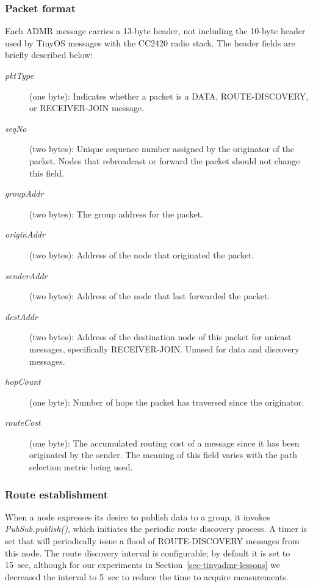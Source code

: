 \subsubsection{Packet format}

Each ADMR message carries a 13-byte header, not including the
10-byte header used by TinyOS messages with the CC2420 radio stack.
The header fields are briefly described below:
\begin{description}
\item[{\em pktType}] (one byte): Indicates whether a packet is
a DATA, ROUTE-DISCOVERY, or RECEIVER-JOIN message.
\item[{\em seqNo}] (two bytes): 
Unique sequence number
assigned by the originator of the packet. Nodes that rebroadcast or
forward the packet should not change this field. 
\item[{\em groupAddr}] (two bytes): The group address for the packet.
\item[{\em originAddr}] (two bytes): 
Address of the node that originated the packet. 
\item[{\em senderAddr}] (two bytes): 
Address of the node that last forwarded the packet. 
\item[{\em destAddr}] (two bytes):
Address of the destination node of this packet for unicast messages,
specifically RECEIVER-JOIN. Unused for data and discovery messages.
\item[{\em hopCount}] (one byte):
Number of hops the packet has traversed since
the originator. 
\item[{\em routeCost}] (one byte): 
The accumulated routing cost of a message since it has been originated
by the sender. The meaning of this field varies with the path
selection metric being used.
\end{description}


\subsubsection{Route establishment}

When a node expresses its desire to publish data to a group, 
it invokes {\em PubSub.publish()}, which initiates the periodic
route discovery process. A timer is set that will periodically
issue a flood of ROUTE-DISCOVERY messages from this node. The route
discovery interval is configurable; by default it is set to 15~sec,
although for our experiments in Section~\ref{sec-tinyadmr-lessons} we decreased
the interval to 5~sec to reduce the time to acquire measurements.

